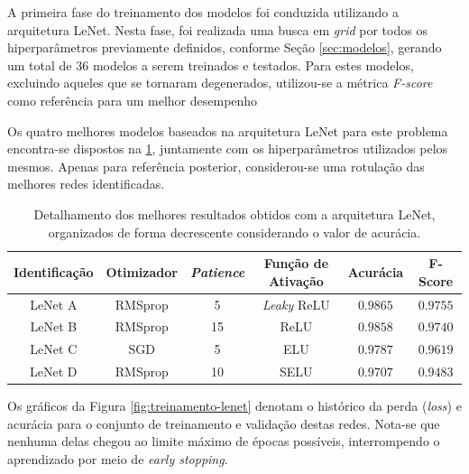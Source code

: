 

A primeira fase do treinamento dos modelos foi conduzida utilizando a arquitetura LeNet. Nesta fase, foi realizada uma busca em \emph{grid} por todos os hiperparâmetros previamente definidos, conforme Seção \ref{sec:modelos}, gerando um total de $36$ modelos a serem treinados e testados. Para estes modelos, excluindo aqueles que se tornaram degenerados, utilizou-se a métrica \emph{F-score} como referência para um melhor desempenho

Os quatro melhores modelos baseados na arquitetura LeNet para este problema encontra-se dispostos na \ref{tab:lenet}, juntamente com os hiperparâmetros utilizados pelos mesmos. Apenas para referência posterior, considerou-se uma rotulação das melhores redes identificadas.

\begin{table}[h]
\centering
\caption{Detalhamento dos melhores resultados obtidos com a arquitetura LeNet, organizados de forma decrescente considerando o valor de acurácia.}
\label{tab:lenet}
\begin{tabular}{cccccc}
\toprule
\textbf{Identificação} & \textbf{Otimizador} & \textbf{\emph{Patience}}  & \textbf{Função de Ativação} & \textbf{Acurácia} & \textbf{F-Score} \\
\midrule
LeNet A & RMSprop & 5 & \emph{Leaky} ReLU & $0.9865$ & $0.9755$ \\
LeNet B & RMSprop & 15 & ReLU & $0.9858$ & $0.9740$\\
LeNet C & SGD & 5 & ELU & $0.9787$ & $0.9619$ \\
LeNet D & RMSprop & 10 & SELU & $0.9707$ & $0.9483$ \\
\bottomrule
\end{tabular}
\end{table}


Os gráficos da Figura \ref{fig:treinamento-lenet} denotam o histórico da perda (\emph{loss}) e acurácia para o conjunto de treinamento e validação destas redes. Nota-se que nenhuma delas chegou ao limite máximo de épocas possíveis, interrompendo o aprendizado por meio de \emph{early stopping}.

